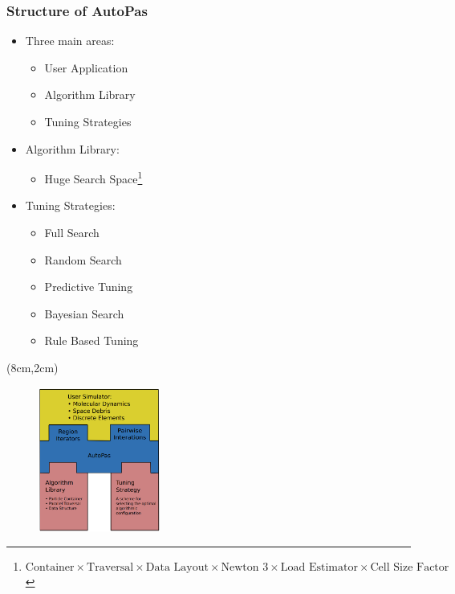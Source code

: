 \documentclass[
	10pt,
	t		%
]{beamer}
\begin{document}
\begin{frame}
	\frametitle{Structure of AutoPas}
	
	\begin{itemize}
		\item Three main areas:
		      \begin{itemize}
			      \item User Application
			      \item Algorithm Library
			      \item Tuning Strategies
		      \end{itemize}
		\item Algorithm Library:
		      \begin{itemize}
			      \item Huge Search Space\footnote{\scriptsize{$\text{Container}\times\text{Traversal} \times \text{Data Layout} \times \text{Newton 3} \times \text{Load Estimator} \times \text{Cell Size Factor}$}
			            }
		      \end{itemize}
		\item Tuning Strategies:
		      \begin{itemize}
			      \item Full Search
			      \item Random Search
			      \item Predictive Tuning
			      \item Bayesian Search
			      \item Rule Based Tuning
		      \end{itemize}
	\end{itemize}
	
	\begin{textblock*}{4cm}(8cm,2cm)
		\begin{figure}
			\includegraphics[width=4cm]{figures/AutoPasLibraryStructure.png}
			\caption{ \scriptsize{\cite{Newcome2023Poster}}}
			
		\end{figure}
	\end{textblock*}
\end{frame}
\end{document}
